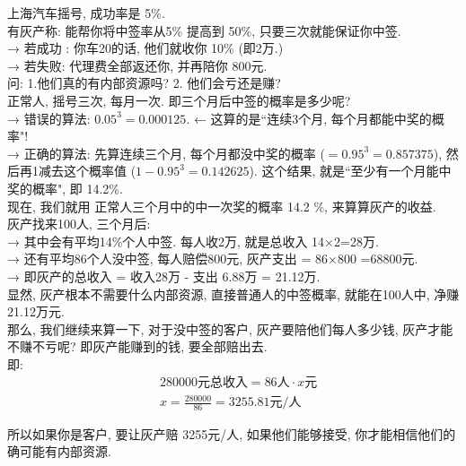 \documentclass[UTF8]{ctexart}
\begin{document}
	
	\begin{myEnvSample}
		上海汽车摇号, 成功率是 5\%. \\
		有灰产称: 能帮你将中签率从5\% 提高到 50\%, 只要三次就能保证你中签. \\
		→ 若成功 : 你车20的话, 他们就收你 10\% (即2万.) \\
		→ 若失败: 代理费全部返还你, 并再陪你 800元. \\
		问: 1.他们真的有内部资源吗? 2. 他们会亏还是赚? \\
		
		正常人, 摇号三次, 每月一次. 即三个月后中签的概率是多少呢? \\
		→ 错误的算法: $	0.05^3=0.000125	$. ← 这算的是``连续3个月, 每个月都能中奖的概率"! \\
		→ 正确的算法: 先算连续三个月, 每个月都没中奖的概率 ($=0.95^3=0.857375	$), 然后再1减去这个概率值 ($1-0.95^3=0.142625$). 这个结果, 就是``至少有一个月能中奖的概率", 即 14.2\%. \\
		
		现在, 我们就用 正常人三个月中的中一次奖的概率 14.2 \%, 来算算灰产的收益. \\
		灰产找来100人, 三个月后: \\
		→ 其中会有平均14\%个人中签. 每人收2万, 就是总收入 14×2=28万. \\
		→ 还有平均86个人没中签, 每人赔偿800元, 灰产支出 = 86×800 =68800元. \\
		→ 即灰产的总收入 = 收入28万 - 支出 6.88万 = 21.12万. \\
		显然, 灰产根本不需要什么内部资源, 直接普通人的中签概率, 就能在100人中, 净赚21.12万元. \\
		
		那么, 我们继续来算一下, 对于没中签的客户, 灰产要陪他们每人多少钱, 灰产才能不赚不亏呢?  即灰产能赚到的钱, 要全部赔出去. \\
		即: 
		\begin{align*}  %
			&	280000\text{元总收入}=86\text{人}\cdot x\text{元}\\
			& x=\frac{280000}{86}=3255.81\text{元/人}
		\end{align*} 
		
		所以如果你是客户, 要让灰产赔 3255元/人, 如果他们能够接受, 你才能相信他们的确可能有内部资源.
		
		
		
		
		
		
	\end{myEnvSample}
	
	
	
\end{document}
